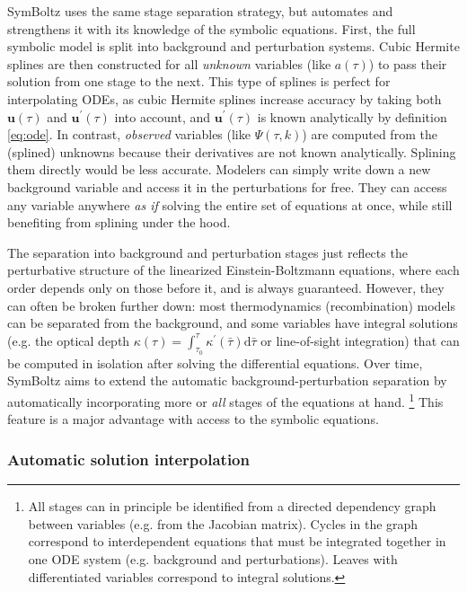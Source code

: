 \documentclass{aa}
\begin{document}
SymBoltz uses the same stage separation strategy, but automates and strengthens it with its knowledge of the symbolic equations.
First, the full symbolic model is split into background and perturbation systems.
Cubic Hermite splines are then constructed for all \emph{unknown} variables (like $a(\tau)$) to pass their solution from one stage to the next.
This type of splines is perfect for interpolating ODEs, as cubic Hermite splines increase accuracy by taking both $\boldsymbol{u}(\tau)$ and $\boldsymbol{u}^\prime(\tau)$ into account, and $\boldsymbol{u}^\prime(\tau)$ is known analytically by definition \eqref{eq:ode}.
In contrast, \emph{observed} variables (like $\Psi(\tau,k)$) are computed from the (splined) unknowns because their derivatives are not known analytically.
Splining them directly would be less accurate.
Modelers can simply write down a new background variable and access it in the perturbations for free.
They can access any variable anywhere \emph{as if} solving the entire set of equations at once, while still benefiting from splining under the hood.

The separation into background and perturbation stages just reflects the perturbative structure of the linearized Einstein-Boltzmann equations, where each order depends only on those before it, and is always guaranteed.
However, they can often be broken further down: most thermodynamics (recombination) models can be separated from the background, and some variables have integral solutions (e.g. the optical depth $\kappa(\tau) = \int_{\tau_0}^\tau \kappa^\prime(\bar\tau) \mathrm{d}\bar\tau$ or line-of-sight integration) that can be computed in isolation after solving the differential equations.
Over time, SymBoltz aims to extend the automatic background-perturbation separation by automatically incorporating more or \emph{all} stages of the equations at hand.%
\footnote{All stages can in principle be identified from a directed dependency graph between variables (e.g. from the Jacobian matrix). Cycles in the graph correspond to interdependent equations that must be integrated together in one ODE system (e.g. background and perturbations). Leaves with differentiated variables correspond to integral solutions.}
This feature is a major advantage with access to the symbolic equations.

\subsubsection{Automatic solution interpolation}
\label{sec:interpolation}
\end{document}
